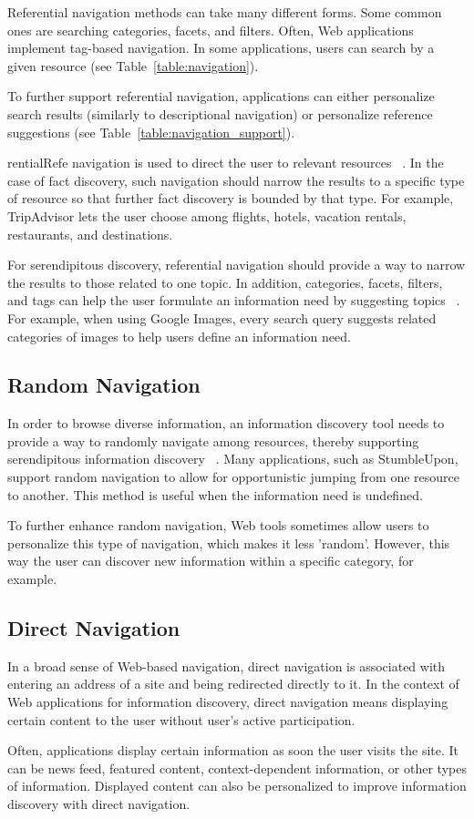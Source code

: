 {{Referential navigation methods can take many different forms. Some common ones are searching categories, facets, and filters. Often, Web applications implement tag-based navigation. In some applications, users can search by a given resource (see Table~\ref{table:navigation}).

To further support referential navigation, applications can either personalize search results (similarly to descriptional navigation) or personalize reference suggestions (see Table~\ref{table:navigation_support}). 

rentialRefe navigation is used to direct the user to relevant resources ~\cite{levene}. In the case of fact discovery, such navigation should narrow the results to a specific type of resource so that further fact discovery is bounded by that type. For example, TripAdvisor lets the user choose among flights, hotels, vacation rentals, restaurants, and destinations.

For serendipitous discovery, referential navigation should provide a way to narrow the results to those related to one topic. In addition, categories, facets, filters, and tags can help the user formulate an information need by suggesting topics ~\cite{levene}. For example, when using Google Images, every search query suggests related categories of images to help users define an information need.

} %

{\subsection{Random Navigation}
In order to browse diverse information, an information discovery tool needs to provide a way to randomly navigate among resources, thereby supporting serendipitous information discovery ~\cite{foster}. Many applications, such as StumbleUpon, support random navigation to allow for opportunistic jumping from one resource to another. This method is useful when the information need is undefined.

To further enhance random navigation, Web tools sometimes allow users to personalize this type of navigation, which makes it less 'random'. However, this way the user can discover new information within a specific category, for example.
} %

{\subsection{Direct Navigation}
In a broad sense of Web-based navigation, direct navigation is associated with entering an address of a site and being redirected directly to it. In the context of Web applications for information discovery, direct navigation means displaying certain content to the user without user's active participation.  

Often, applications display certain information as soon the user visits the site. It can be news feed, featured content, context-dependent information, or other types of information. Displayed content can also be personalized to improve information discovery with direct navigation.

} %


} %

